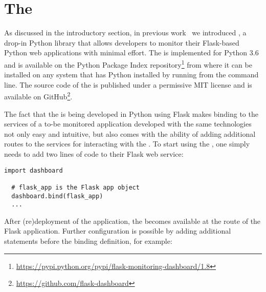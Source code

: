 \documentclass{sig-alternate-05-2015}
\begin{document}



\section{The \tool}
\label{sec:tool}


  As discussed in the introductory section, in previous work~\cite{vogel2017low} we introduced \tool, a drop-in Python library that allows developers to monitor their Flask-based Python web applications with minimal effort.
%
  The \tool is implemented for Python 3.6 and is available on the Python Package Index repository\footnote{\url{https://pypi.python.org/pypi/flask-monitoring-dashboard/1.8}} from where it can be installed on any system that has Python installed by running \install from the command line. 
%  
  The source code of the \tool is published under a permissive MIT license and is available on GitHub\footnote{\url{https://github.com/flask-dashboard}}.
  
  The fact that the \tool is being developed in Python using Flask makes binding to the services of a to-be monitored application developed with the same technologies not only easy and intuitive, but also comes with the ability of adding additional routes to the services for interacting with the \tool.
  To start using the \tool, one simply needs to add two lines of code to their Flask web service:

  \begin{lstlisting}[style=custompython]
  import dashboard

  # flask_app is the Flask app object
  dashboard.bind(flask_app)
  ...
  \end{lstlisting}

  After (re)deployment of the application, the \tool becomes available at the  route of the Flask application. Further configuration is possible by adding additional statements before the binding definition, for example:
\end{document}
